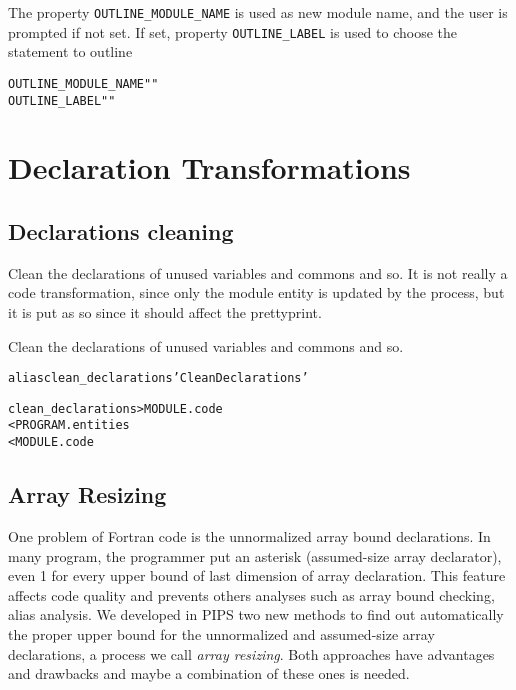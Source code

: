 \documentclass[a4paper]{report}
\newenvironment{PipsProp}{\begin{alltt}}{\end{alltt}}
\newenvironment{PipsMake}{\begin{alltt}}{\end{alltt}}
\begin{document}
The property \verb+OUTLINE_MODULE_NAME+ is used as new module name, and the user is prompted if not set.
If set, property \verb+OUTLINE_LABEL+ is used to choose the statement to outline
\begin{PipsProp}
OUTLINE_MODULE_NAME ""
OUTLINE_LABEL ""
\end{PipsProp}



\section{Declaration Transformations}

\subsection{Declarations cleaning}

Clean the declarations of unused variables and commons and so.
It is not really a code transformation, since only the module entity is
updated by the process, but it is put as so since it should affect the
prettyprint.

Clean the declarations of unused variables and commons and so.
\begin{PipsMake}

alias clean_declarations 'Clean Declarations'

clean_declarations      > MODULE.code
        < PROGRAM.entities
        < MODULE.code
\end{PipsMake}

\subsection{Array Resizing}
\label{subsubsection-array-resizing}

One problem of Fortran code is the unnormalized array bound
declarations. In many program, the programmer put an asterisk
(assumed-size array declarator), even 1 for every
upper bound of last dimension of array declaration. This feature affects
code quality and prevents others analyses such as array bound checking,
alias analysis. We developed in PIPS two new methods to find out
automatically the proper upper bound for the unnormalized and assumed-size
array declarations, a process we call {\em array resizing}. Both
approaches have advantages and drawbacks and maybe a combination of these
ones is needed.
\end{document}
